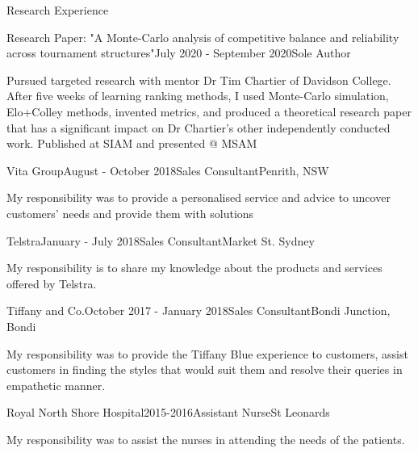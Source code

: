 \documentclass{resume} %
\begin{document}
\begin{rSection}{Research Experience}

\begin{rSubsection}{Research Paper: "A Monte-Carlo analysis of competitive balance and reliability across tournament structures"}{July 2020 - September 2020}{Sole Author}
\item Pursued targeted research with  mentor Dr Tim Chartier of Davidson College. After five weeks of learning ranking methods, I used Monte-Carlo simulation, Elo+Colley methods, invented metrics, and produced a theoretical research paper that has a significant impact on Dr Chartier's other independently conducted work. Published at SIAM and presented @ MSAM

\end{rSubsection}


\begin{rSubsection}{Vita Group}{August - October 2018}{Sales Consultant}{Penrith, NSW}
\item My responsibility was to provide a personalised service and advice to uncover customers' needs and provide them with solutions
\end{rSubsection}


\begin{rSubsection}{Telstra}{January - July 2018}{Sales Consultant}{Market St. Sydney}
\item My responsibility is to share my knowledge about the products and services  offered by Telstra. 
\end{rSubsection}

\begin{rSubsection}{Tiffany and Co.}{October 2017 - January 2018}{Sales Consultant}{Bondi Junction, Bondi}
\item My responsibility was to provide the Tiffany Blue experience to customers, assist customers in finding the styles that would suit them and resolve their queries in empathetic manner.

\end{rSubsection}

\begin{rSubsection}{Royal North Shore Hospital}{2015-2016}{Assistant Nurse}{St Leonards}
\item My responsibility was to assist the nurses in attending the needs of the patients. 

\end{rSubsection}
\end{rSection}
\end{document}
